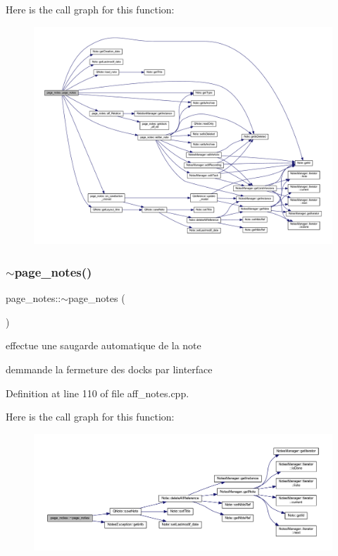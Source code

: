 Here is the call graph for this function\+:\nopagebreak
\begin{figure}[H]
\begin{center}
\leavevmode
\includegraphics[width=350pt]{classpage__notes_ad9a1b3dbe6c7901ed37a5784b1094fa6_cgraph}
\end{center}
\end{figure}
\mbox{\label{classpage__notes_a736d7d7d13818c43a20b20127845c6c0}} 
\subsubsection{\texorpdfstring{$\sim$page\+\_\+notes()}{~page\_notes()}}
{\footnotesize\ttfamily page\+\_\+notes\+::$\sim$page\+\_\+notes (\begin{DoxyParamCaption}{ }\end{DoxyParamCaption})}



effectue une saugarde automatique de la note 

demmande la fermeture des docks par l\textquotesingle{}interface 

Definition at line 110 of file aff\+\_\+notes.\+cpp.

Here is the call graph for this function\+:\nopagebreak
\begin{figure}[H]
\begin{center}
\leavevmode
\includegraphics[width=350pt]{classpage__notes_a736d7d7d13818c43a20b20127845c6c0_cgraph}
\end{center}
\end{figure}


